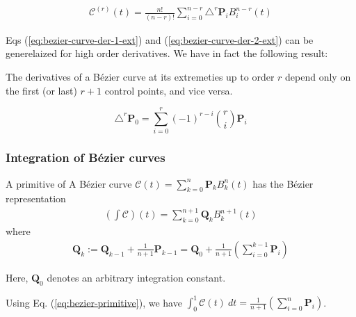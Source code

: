 \begin{proposition}
  \begin{align}
    \mathcal{C}^{(r)}(t) = \frac{n!}{\left( n-r \right)!} \sum\limits_{i=0}^{n-r} \triangle^r \mathbf{P}_i B_i^{n-r}(t) 
    \label{eq:bezier-high-deriv}
  \end{align}
\end{proposition}
\noindent
Eqs (\ref{eq:bezier-curve-der-1-ext}) and (\ref{eq:bezier-curve-der-2-ext}) can be generelaized for high order derivatives. We have in fact the following result:
\begin{remark}
The derivatives of a B\'ezier curve at its extremeties up to order $r$ depend only on the first (or last) $r+1$ control points, and vice versa.
\end{remark}
\begin{proposition}
  \label{prop:bezier-forward-difference}
  $$\triangle^r \mathbf{P}_0 = \sum\limits_{i=0}^{r} \left( -1 \right)^{r-i} \binom{r}{i} \mathbf{P}_i $$
\end{proposition}

\subsubsection*{Integration of B\'ezier curves}
\begin{proposition}
A primitive of A B\'ezier curve $\mathcal{C}(t) = \sum_{k=0}^n \mathbf{P}_k B_k^n(t)$ has the B\'ezier representation
\begin{align}
  \left( \int \mathcal{C} \right) (t) = \sum_{k=0}^{n+1} \mathbf{Q}_k B_k^{n+1}(t)
  \label{eq:bezier-primitive}
\end{align}
where
\begin{align*}
  \mathbf{Q}_k := \mathbf{Q}_{k-1} + \frac{1}{n+1} \mathbf{P}_{k-1} 
                = \mathbf{Q}_{0}  + \frac{1}{n+1} \left( \sum\limits_{i=0}^{k-1} \mathbf{P}_{i}  \right)
\end{align*}
\end{proposition}
Here, $\mathbf{Q}_{0}$ denotes an arbitrary integration constant.
\begin{remark}
  Using Eq. (\ref{eq:bezier-primitive}), we have $\int_0^1 \mathcal{C}(t)~dt = \frac{1}{n+1}\left( \sum\limits_{i=0}^n \mathbf{P}_i \right)$.
\end{remark}

